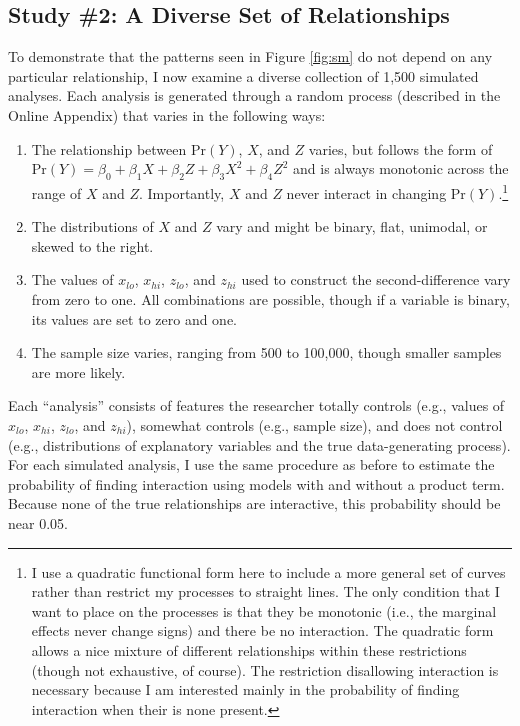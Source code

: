 \documentclass[12pt]{article}
\begin{document}
\subsection*{Study \#2: A Diverse Set of Relationships}

To demonstrate that the patterns seen in Figure \ref{fig:sm} do not depend on any particular relationship, I now examine a diverse collection of 1,500 simulated analyses. Each analysis is generated through a random process (described in the Online Appendix) that varies in the following ways:\singlespace\vspace{-3mm}
\begin{enumerate}
\item The relationship between $\text{Pr}(Y)$, $X$, and $Z$ varies, but follows the form of $\text{Pr}(Y) = \beta_0 + \beta_1X + \beta_2Z + \beta_3X^2 + \beta_4Z^2$ and is always monotonic across the range of $X$ and $Z$. Importantly, $X$ and $Z$ never interact in changing $\text{Pr}(Y)$.\footnote{I use a quadratic functional form here to include a more general set of curves rather than restrict my processes to straight lines. The only condition that I want to place on the processes is that they be monotonic (i.e., the marginal effects never change signs) and there be no interaction. The quadratic form allows a nice mixture of different relationships within these restrictions (though not exhaustive, of course). The restriction disallowing interaction is necessary because I am interested mainly in the probability of finding interaction when their is none present.}
\item The distributions of $X$ and $Z$ vary and might be binary, flat, unimodal, or  skewed to the right.
\item The values of $x_{lo}$, $x_{hi}$, $z_{lo}$, and $z_{hi}$ used to construct the second-difference vary from zero to one. All combinations are possible, though if a variable is binary, its values are set to zero and one.
\item The sample size varies, ranging from 500 to 100,000, though smaller samples are more likely.


\end{enumerate}
\doublespace
Each ``analysis'' consists of features the researcher totally controls (e.g., values of $x_{lo}$, $x_{hi}$, $z_{lo}$, and $z_{hi}$), somewhat controls (e.g., sample size), and does not control (e.g., distributions of explanatory variables and the true data-generating process). For each simulated analysis, I use the same procedure as before to estimate the probability of finding interaction using models with and without a product term. Because none of the true relationships are interactive, this probability should be near 0.05. 
\end{document}
